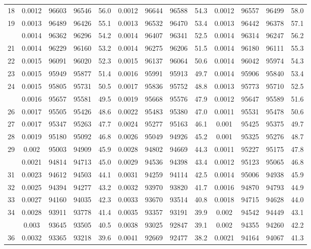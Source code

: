 \documentclass[
  14pt,
]{article}
\begin{document}
\begin{longtable}[t]{lcccccccccccc}
18 & 0.0012 & 96603 & 96546 & 56.0 & 0.0012 & 96644 & 96588 & 54.3 & 0.0012 & 96557 & 96499 & 58.0\\
19 & 0.0013 & 96489 & 96426 & 55.1 & 0.0013 & 96532 & 96470 & 53.4 & 0.0013 & 96442 & 96378 & 57.1\\
\addlinespace
20 & 0.0014 & 96362 & 96296 & 54.2 & 0.0014 & 96407 & 96341 & 52.5 & 0.0014 & 96314 & 96247 & 56.2\\
21 & 0.0014 & 96229 & 96160 & 53.2 & 0.0014 & 96275 & 96206 & 51.5 & 0.0014 & 96180 & 96111 & 55.3\\
22 & 0.0015 & 96091 & 96020 & 52.3 & 0.0015 & 96137 & 96064 & 50.6 & 0.0014 & 96042 & 95974 & 54.3\\
23 & 0.0015 & 95949 & 95877 & 51.4 & 0.0016 & 95991 & 95913 & 49.7 & 0.0014 & 95906 & 95840 & 53.4\\
24 & 0.0015 & 95805 & 95731 & 50.5 & 0.0017 & 95836 & 95752 & 48.8 & 0.0013 & 95773 & 95710 & 52.5\\
\addlinespace
25 & 0.0016 & 95657 & 95581 & 49.5 & 0.0019 & 95668 & 95576 & 47.9 & 0.0012 & 95647 & 95589 & 51.6\\
26 & 0.0017 & 95505 & 95426 & 48.6 & 0.0022 & 95483 & 95380 & 47.0 & 0.0011 & 95531 & 95478 & 50.6\\
27 & 0.0017 & 95347 & 95263 & 47.7 & 0.0024 & 95277 & 95163 & 46.1 & 0.001 & 95425 & 95375 & 49.7\\
28 & 0.0019 & 95180 & 95092 & 46.8 & 0.0026 & 95049 & 94926 & 45.2 & 0.001 & 95325 & 95276 & 48.7\\
29 & 0.002 & 95003 & 94909 & 45.9 & 0.0028 & 94802 & 94669 & 44.3 & 0.0011 & 95227 & 95175 & 47.8\\
\addlinespace
30 & 0.0021 & 94814 & 94713 & 45.0 & 0.0029 & 94536 & 94398 & 43.4 & 0.0012 & 95123 & 95065 & 46.8\\
31 & 0.0023 & 94612 & 94503 & 44.1 & 0.0031 & 94259 & 94114 & 42.5 & 0.0014 & 95006 & 94938 & 45.9\\
32 & 0.0025 & 94394 & 94277 & 43.2 & 0.0032 & 93970 & 93820 & 41.7 & 0.0016 & 94870 & 94793 & 44.9\\
33 & 0.0027 & 94160 & 94035 & 42.3 & 0.0033 & 93670 & 93514 & 40.8 & 0.0018 & 94715 & 94628 & 44.0\\
34 & 0.0028 & 93911 & 93778 & 41.4 & 0.0035 & 93357 & 93191 & 39.9 & 0.002 & 94542 & 94449 & 43.1\\
\addlinespace
35 & 0.003 & 93645 & 93505 & 40.5 & 0.0038 & 93025 & 92847 & 39.1 & 0.002 & 94355 & 94260 & 42.2\\
36 & 0.0032 & 93365 & 93218 & 39.6 & 0.0041 & 92669 & 92477 & 38.2 & 0.0021 & 94164 & 94067 & 41.3\\

\end{longtable}
\end{document}
